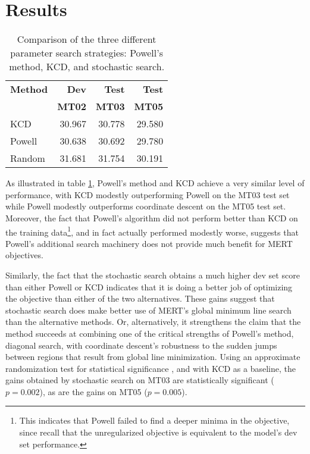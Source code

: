 \documentclass[11pt]{article}
\begin{document}
  


\section{Results}

\begin{table}
\begin{center}
\begin{tabular}{|l|rrr|}
\hline \bf Method  & \bf Dev  & \bf Test & \bf Test \\ 
                   & \bf MT02 & \bf MT03 & \bf MT05 \\ \hline
KCD        & 30.967 & 30.778 & 29.580 \\
Powell     & 30.638 & 30.692 & 29.780  \\
Random     & 31.681 & 31.754 & 30.191 \\
\hline
\end{tabular}
\end{center}
\caption{
\label{searchstrat}
Comparison of the three different parameter search strategies: Powell's method, KCD, and stochastic search.}
\end{table}

As illustrated in table \ref{searchstrat}, Powell's method and KCD achieve a very similar level of performance, with KCD modestly outperforming Powell on the MT03 test set while Powell modestly outperforms coordinate descent on the MT05 test set. Moreover, the fact that Powell's algorithm did not perform better than KCD on the training data\footnote{This indicates that Powell failed to find a deeper minima in the objective, since recall that the unregularized objective is equivalent to the model's dev set performance.}, and in fact actually performed modestly worse, suggests that Powell's additional search machinery does not provide much benefit for MERT objectives. 

Similarly, the fact that the stochastic search obtains a much higher dev set score than either Powell or KCD indicates that it is doing a better job of optimizing the objective than either of the two alternatives. These gains suggest that stochastic search does make better use of MERT's global minimum line search than the alternative methods. Or, alternatively, it strengthens the claim that the method succeeds at combining one of the critical strengths of Powell's method, diagonal search, with coordinate descent's robustness to the sudden jumps between regions that result from global line minimization. Using an approximate randomization test for statistical significance \cite{fk2005}, and with KCD as a baseline, the gains obtained by stochastic search on MT03 are statistically significant (\mbox{$p = 0.002$}), as are the gains on MT05 (\mbox{$p=0.005$}). 
\end{document}
